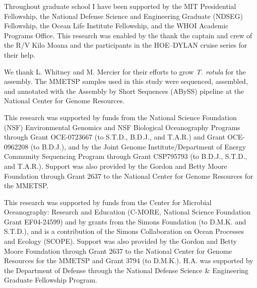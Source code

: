 {Throughout graduate school I have been supported by the MIT Presidential Fellowship, the National Defense Science and Engineering Graduate (NDSEG) Fellowship, the Ocean Life Institute Fellowship, and the WHOI Academic Programs Office. 
This research was enabled by the thank the captain and crew of the R/V Kilo Moana and the participants in the HOE–DYLAN cruise series for their help. 

We thank L. Whitney and M. Mercier for their efforts to grow \textit{T. rotula} for the assembly. The MMETSP samples used in this study were sequenced, assembled, and annotated with the Assembly by Short Sequences (ABySS) pipeline at the National Center for Genome Resources. 

This research was supported by funds from the National Science Foundation (NSF) Environmental Genomics and NSF Biological Oceanography Programs through Grant OCE-0723667 (to S.T.D., B.D.J., and T.A.R.) and Grant OCE-0962208 (to B.D.J.), and by the Joint Genome Institute/Department of Energy Community Sequencing Program through Grant CSP795793 (to B.D.J., S.T.D., and T.A.R.). Support was also provided by the Gordon and Betty Moore Foundation through Grant 2637 to the National Center for Genome Resources for the MMETSP.


This research was supported by funds from the Center for Microbial Oceanography: Research and Education (C-MORE, National Science Foundation Grant EF04-24599) and by grants from the Simons Foundation (to D.M.K. and S.T.D.), and is a contribution of the Simons Collaboration on Ocean Processes and Ecology (SCOPE). Support was also provided by the Gordon and Betty Moore Foundation through Grant 2637 to the National Center for Genome Resources for the MMETSP and Grant 3794 (to D.M.K.). H.A. was supported by the Department of Defense through the National Defense Science \& Engineering Graduate Fellowship Program.






}
    
